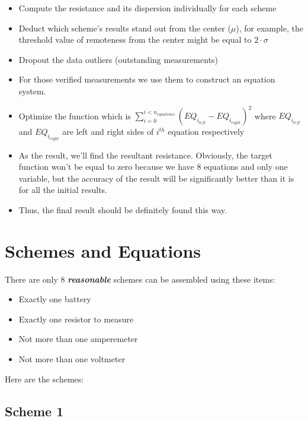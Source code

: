 \documentclass[11pt]{memoir}
\begin{document}
        \begin{itemize}
            \item Compute the resistance and its dispersion individually for each scheme
            \item Deduct which scheme's results stand out from the center ($\mu$), for example, the threshold value of remoteness from the center might be equal to $2 \cdot \sigma$
            \item Dropout the data outliers (outstanding measurements)
            \item For those verified measurements we use them to construct an equation system.
            \item Optimize the function which is ${\sum_{i=0}^{i<n_{equations}} \left(EQ_{i_{left}} - EQ_{i_{right}}\right) ^ 2}$\newline
                where $EQ_{i_{left}}$ and $EQ_{i_{right}}$ are left and right sides of $i^{th}$ equation respectively
            \item \label{itm:low-dispersion} As the result, we'll find the resultant resistance.\newline
            Obviously, the target function won't be equal to zero because we have 8 equations and only one variable, but the accuracy of the result will be significantly better than it is for all the initial results.
            \item Thus, the final result should be definitely found this way.
        \end{itemize}

    \section{Schemes and Equations}\label{sec:schemes-and-equations}
        There are only 8 \textit{\textbf{reasonable}} schemes can be assembled using these items:
        \begin{itemize}
            \item Exactly one battery
            \item Exactly one resistor to measure
            \item Not more than one amperemeter
            \item Not more than one voltmeter
        \end{itemize}

        Here are the schemes:

        \subsection{Scheme 1}\label{subsec:scheme-1}
\end{document}
